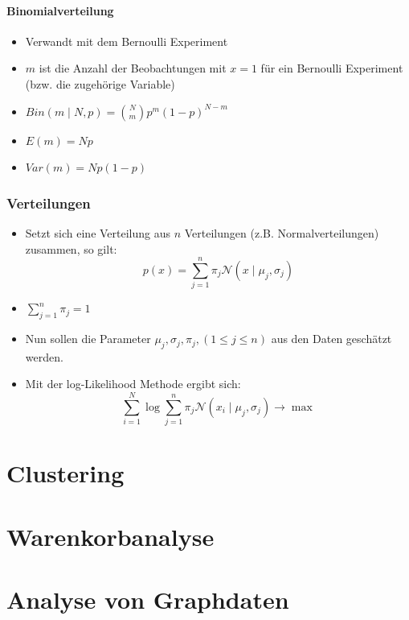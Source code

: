 \documentclass{scrartcl}
\begin{document}
\paragraph{Binomialverteilung}

\begin{itemize}
	\item Verwandt mit dem Bernoulli Experiment
	\item $ m $ ist die Anzahl der Beobachtungen mit $ x=1 $ für ein Bernoulli 
	Experiment (bzw. die zugehörige Variable)
	\item $ Bin(m \mid N,p) = \binom{N}{m} p^m (1-p)^{N-m} $
	\item $ E(m) = Np $
	\item $ Var(m) = Np(1-p) $
\end{itemize}

\subsubsection{Verteilungen}

\begin{itemize}
	\item Setzt sich eine Verteilung aus $ n $ Verteilungen (z.B. 
	Normalverteilungen) zusammen, so gilt:
	\[ p(x) = \sum_{j=1}^{n} \pi_j \mathcal{N} (x \mid \mu_j, \sigma_j) \]
	\item $ \sum_{j=1}^{n} \pi_j = 1 $
	\item Nun sollen die Parameter $ \mu_j, \sigma_j, \pi_j, (1 \leq j \leq n) 
	$ aus den Daten geschätzt werden.
	\item Mit der log-Likelihood Methode ergibt sich:
	\[ \sum_{i=1}^{N} \log  \sum_{j=1}^{n} \pi_j \mathcal{N} (x_i \mid \mu_j, 
	\sigma_j) \rightarrow \max \]
\end{itemize}

\section{Clustering}

\section{Warenkorbanalyse}

\section{Analyse von Graphdaten}
\end{document}
